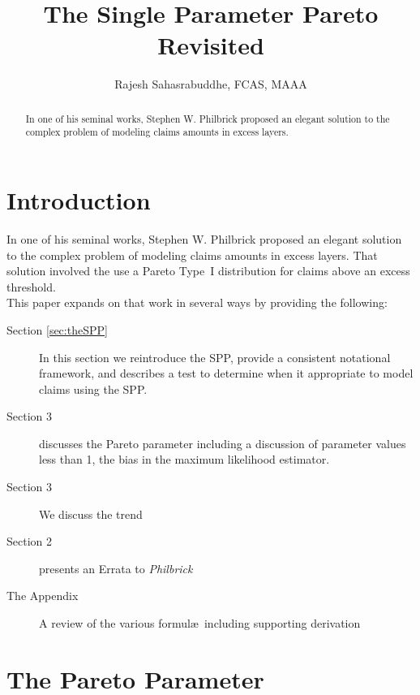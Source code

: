 \documentclass[]{article} %
\title{The Single Parameter Pareto Revisited}
\author{Rajesh Sahasrabuddhe, FCAS, MAAA}
\newcommand{\philbrick}{\textit{Philbrick}}
\begin{document}
\maketitle

\begin{abstract}
In one of his seminal works, Stephen W. Philbrick proposed an elegant solution to the complex problem of modeling claims amounts in excess layers. 

\end{abstract}

\section{Introduction}
In one of his seminal works, Stephen W. Philbrick\cite{Philbrick} proposed an elegant solution to the complex problem of modeling claims amounts in excess layers. That solution involved the use a Pareto Type~I distribution for claims above an excess threshold.\\

This paper expands on that work in several ways by providing the following:
\begin{description}
	\item[Section \ref{sec:theSPP}] In this section we reintroduce the SPP, provide a consistent notational framework, and describes a test to determine when it appropriate to model claims using the SPP.
	\item[Section 3] discusses the Pareto parameter including a discussion of parameter values less than 1, the bias in the maximum likelihood estimator.
	\item [Section 3] We discuss the trend
	\item[Section 2] presents an Errata to \philbrick
	\item[The Appendix] A review of the various formul\ae~including supporting derivation
\end{description}


\section{The Pareto Parameter}
\end{document}
